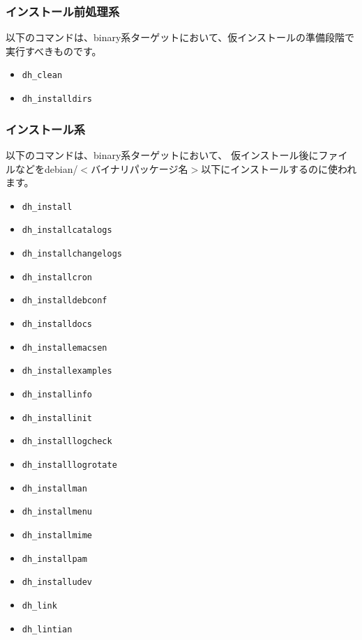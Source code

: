 \documentclass[mingoth,a4paper]{jsarticle}
\begin{document}
\subsubsection{インストール前処理系}

以下のコマンドは、binary系ターゲットにおいて、仮インストールの準備段階で実行すべきものです。

\begin{itemize}
 \item \texttt{dh\_clean}
 \item \texttt{dh\_installdirs}
\end{itemize}

\subsubsection{インストール系}

以下のコマンドは、binary系ターゲットにおいて、
仮インストール後にファイルなどをdebian/$<$バイナリパッケージ名$>$以下にインストールするのに使われます。

\begin{itemize}
 \item \texttt{dh\_install}
 \item \texttt{dh\_installcatalogs}
 \item \texttt{dh\_installchangelogs}
 \item \texttt{dh\_installcron}
 \item \texttt{dh\_installdebconf}
 \item \texttt{dh\_installdocs}
 \item \texttt{dh\_installemacsen}
 \item \texttt{dh\_installexamples}
 \item \texttt{dh\_installinfo}
 \item \texttt{dh\_installinit}
 \item \texttt{dh\_installlogcheck}
 \item \texttt{dh\_installlogrotate}
 \item \texttt{dh\_installman}
 \item \texttt{dh\_installmenu}
 \item \texttt{dh\_installmime}
 \item \texttt{dh\_installpam}
 \item \texttt{dh\_installudev}
 \item \texttt{dh\_link}
 \item \texttt{dh\_lintian}
\end{itemize}
\end{document}
